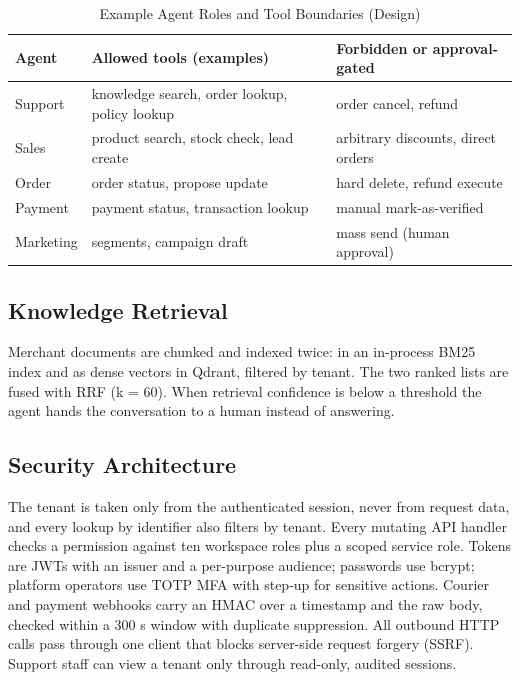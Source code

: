 \documentclass[conference,a4paper]{IEEEtran}
\begin{document}
\begin{table}[!t]
\renewcommand{\arraystretch}{1.2}
\caption{Example Agent Roles and Tool Boundaries (Design)}
\label{tab:1}
\centering\footnotesize
\begin{tabular}{|p{}|p{}|p{}|}
\hline
\textbf{Agent} & \textbf{Allowed tools (examples)} & \textbf{Forbidden or approval-gated} \\
\hline
Support & knowledge search, order lookup, policy lookup & order cancel, refund \\
\hline
Sales & product search, stock check, lead create & arbitrary discounts, direct orders \\
\hline
Order & order status, propose update & hard delete, refund execute \\
\hline
Payment & payment status, transaction lookup & manual mark-as-verified \\
\hline
Marketing & segments, campaign draft & mass send (human approval) \\
\hline
\end{tabular}
\end{table}

\subsection{Knowledge Retrieval}
Merchant documents are chunked and indexed twice: in an in-process BM25 index and as dense vectors in Qdrant, filtered by tenant. The two ranked lists are fused with RRF (k = 60). When retrieval confidence is below a threshold the agent hands the conversation to a human instead of answering.

\subsection{Security Architecture}
The tenant is taken only from the authenticated session, never from request data, and every lookup by identifier also filters by tenant. Every mutating API handler checks a permission against ten workspace roles plus a scoped service role. Tokens are JWTs with an issuer and a per-purpose audience; passwords use bcrypt; platform operators use TOTP MFA with step-up for sensitive actions. Courier and payment webhooks carry an HMAC over a timestamp and the raw body, checked within a 300 s window with duplicate suppression. All outbound HTTP calls pass through one client that blocks server-side request forgery (SSRF). Support staff can view a tenant only through read-only, audited sessions.
\end{document}

